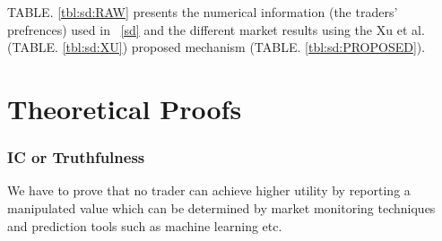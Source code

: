 \endgroup
TABLE. \ref{tbl:sd:RAW} presents the numerical information (the traders' prefrences) used in \figureautorefname~\ref{sd} and the different market results using the Xu et al. (TABLE. \ref{tbl:sd:XU}) proposed mechanism (TABLE. \ref{tbl:sd:PROPOSED}).
\section{Theoretical Proofs} \label{proofs}
\subsubsection{\acf{IC} or Truthfulness}
We have to prove that no trader can achieve higher utility by reporting a manipulated value which can be determined by market monitoring techniques and prediction tools such as machine learning etc.



